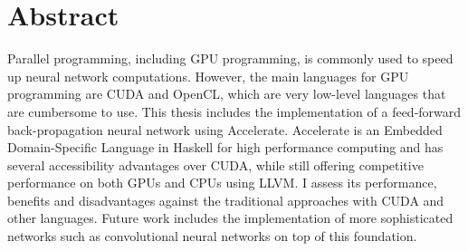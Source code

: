 \chapter*{Abstract}\label{abstract}

Parallel programming, including GPU programming, is commonly used to speed up neural network computations. However, the main languages for GPU programming are CUDA and OpenCL, which are very low-level languages that are cumbersome to use. This thesis includes the implementation of a feed-forward back-propagation neural network using Accelerate. Accelerate is an Embedded Domain-Specific Language in Haskell for high performance computing and has several accessibility advantages over CUDA, while still offering competitive performance on both GPUs and CPUs using LLVM. I assess its performance, benefits and disadvantages against the traditional approaches with CUDA and other languages. Future work includes the implementation of more sophisticated networks such as convolutional neural networks on top of this foundation.
